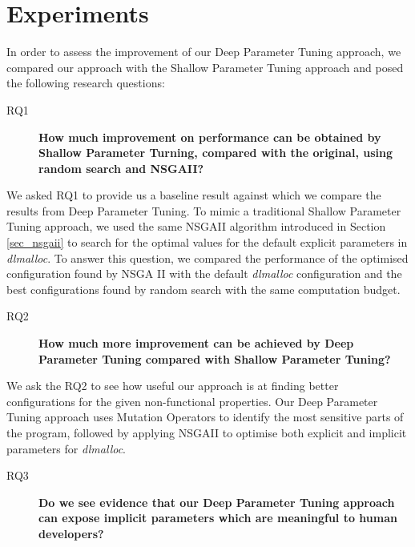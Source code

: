 
\section{Experiments}

In order to assess the improvement of our Deep Parameter Tuning approach, we compared our approach with the Shallow Parameter Tuning approach and posed the following research questions: 
 

\begin{description}
 \item[RQ1] {\bf How much improvement on performance can be obtained by Shallow Parameter Turning, compared with the original, using random search and NSGAII? }
\end{description}

We asked RQ1 to provide us a baseline result against which we compare the results from Deep Parameter Tuning. To mimic a traditional Shallow Parameter Tuning approach, we used the same NSGAII algorithm introduced in Section \ref{sec_nsgaii} to search for the optimal values for the default explicit parameters in \emph{dlmalloc}. To answer this question, we compared the performance of the optimised configuration found by NSGA II with the default \emph{dlmalloc} configuration and the best configurations found by random search with the same computation budget.  

\begin{description}
\item[RQ2] {\bf How much more improvement can be achieved by Deep Parameter Tuning compared with Shallow Parameter Tuning? }
\end{description}

We ask the RQ2 to see how useful our approach is at finding better configurations for the given non-functional properties. Our Deep Parameter Tuning approach uses Mutation Operators to identify the most sensitive parts of the program, followed by applying NSGAII to optimise both explicit and implicit parameters for \emph{dlmalloc}. %

\begin{description}
\item[RQ3] {\bf Do we see evidence that our Deep Parameter Tuning approach can expose implicit parameters which are meaningful to human developers? }
\end{description} 

